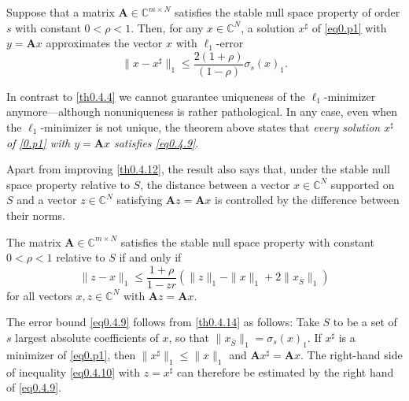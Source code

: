 \begin{theorem}
    \label{th0.4.12}
    Suppose that a matrix $\mathbf{A} \in \mathbb{C}^{m \times N}$ satisfies the stable null space property of order $s$ with constant $0 < \rho <1$. Then, for any $x \in \mathbb{C}^N$, a solution $x^{\sharp}$ of \cref{eq0.p1} with $y = \mathbf{A}x$ approximates the vector $x$ with $\ell_1$-error
    \begin{equation}
        \|x - x^{\sharp}\|_1 \leq \frac{2(1+\rho)}{(1-\rho)} \sigma_s(x)_1.
        \label{eq0.4.9}
    \end{equation}
\end{theorem}

\begin{remark}
    \label{rmk0.4.13}
    In contrast to \cref{th0.4.4} we cannot guarantee uniqueness of the $\ell_1$-minimizer anymore---although nonuniqueness is rather pathological. In any case, even when the $\ell_1$-minimizer is not unique, the theorem above states that \emph{\textcolor[rgb]{1,0,0}{every solution $x^{\sharp}$ of \cref{0.p1} with $y = \mathbf{A}x$ satisfies \cref{eq0.4.9}}}.
\end{remark}

Apart from improving \cref{th0.4.12}, the result also says that, under the stable null space property relative to $S$, the distance between a vector $x \in \mathbb{C}^{N}$ supported on $S$ and a vector $z \in \mathbb{C}^N$ satisfying $\mathbf{A}z = \mathbf{A}x$ is controlled by the difference between their norms.

\begin{theorem}
    \label{th0.4.14}
    The matrix $\mathbf{A} \in \mathbb{C}^{m \times N}$ satisfies the stable null space property with constant $0<\rho<1$ relative to $S$ if and only if 
    \begin{equation}
        \|z-x\|_1 \leq \frac{1+\rho}{1-zr}\left( \|z\|_1 - \|x\|_1 +2\|x_{\bar{S}}\|_1 \right)
        \label{eq0.4.10}
    \end{equation}
    for all vectors $x,z \in \mathbb{C}^N$ with $\mathbf{A}z = \mathbf{A}x$.
\end{theorem}

\textcolor[rgb]{1,0,0}{The error bound \cref{eq0.4.9}} follows from \cref{th0.4.14} as follows: Take $S$ to be a set of $s$ largest absolute coefficients of $x$, so that $\|x_{\bar{S}}\|_1 = \sigma_s(x)_1$. If $x^{\sharp}$ is a minimizer of \cref{eq0.p1}, then $\|x^{\sharp}\|_1 \leq \|x\|_1$ and $\mathbf{A}x^{\sharp} = \mathbf{A}x$. The right-hand side of inequality \cref{eq0.4.10} with $z = x^{\sharp}$ can therefore be estimated by the right hand of \cref{eq0.4.9}.

